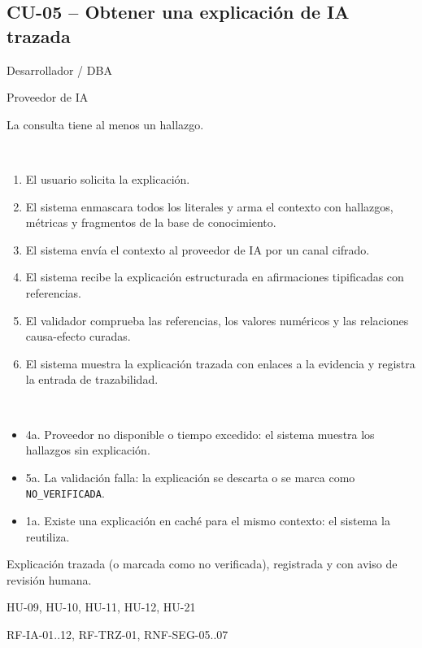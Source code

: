 \documentclass[11pt,a4paper]{report}
\begin{document}
\subsection{CU-05 -- Obtener una explicación de IA trazada}
\begin{description}[leftmargin=3.3cm,style=nextline]
\item[Actor principal] Desarrollador / DBA
\item[Actor secundario] Proveedor de IA
\item[Precondiciones] La consulta tiene al menos un hallazgo.
\item[Flujo principal]~
\begin{enumerate}[leftmargin=1.3em,itemsep=1pt]
\item El usuario solicita la explicación.
\item El sistema enmascara todos los literales y arma el contexto con hallazgos, métricas y fragmentos de la base de conocimiento.
\item El sistema envía el contexto al proveedor de IA por un canal cifrado.
\item El sistema recibe la explicación estructurada en afirmaciones tipificadas con referencias.
\item El validador comprueba las referencias, los valores numéricos y las relaciones causa-efecto curadas.
\item El sistema muestra la explicación trazada con enlaces a la evidencia y registra la entrada de trazabilidad.
\end{enumerate}
\item[Flujos alternos]~
\begin{itemize}[leftmargin=1.3em,itemsep=1pt]
\item 4a. Proveedor no disponible o tiempo excedido: el sistema muestra los hallazgos sin explicación.
\item 5a. La validación falla: la explicación se descarta o se marca como \texttt{NO\_VERIFICADA}.
\item 1a. Existe una explicación en caché para el mismo contexto: el sistema la reutiliza.
\end{itemize}
\item[Postcondici\'on] Explicación trazada (o marcada como no verificada), registrada y con aviso de revisión humana.
\item[Historias relacionadas] HU-09, HU-10, HU-11, HU-12, HU-21
\item[Requisitos relacionados] RF-IA-01..12, RF-TRZ-01, RNF-SEG-05..07
\end{description}
\end{document}
